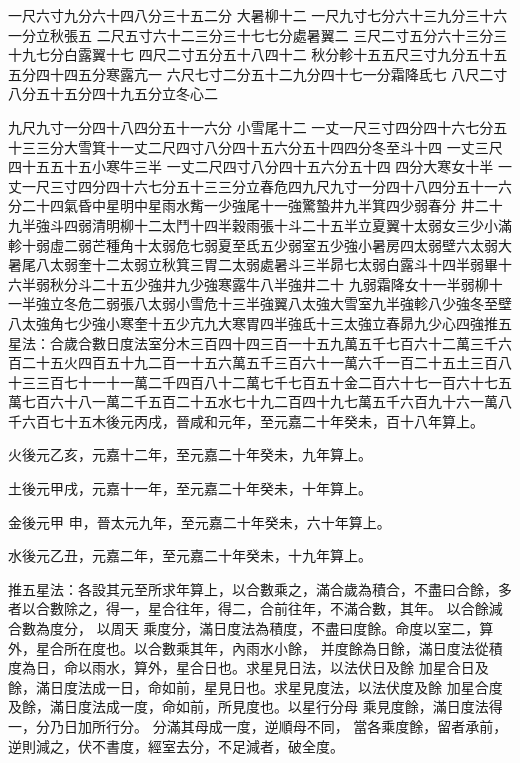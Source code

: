 \begin{pinyinscope}
一尺六寸九分六十四八分三十五二分
 大暑柳十二
 一尺九寸七分六十三九分三十六一分立秋張五
 二尺五寸六十二三分三十七七分處暑翼二
 三尺二寸五分六十三分三十九七分白露翼十七
 四尺二寸五分五十八四十二
 秋分軫十五五尺三寸九分五十五五分四十四五分寒露亢一
 六尺七寸二分五十二九分四十七一分霜降氐七
 八尺二寸八分五十五分四十九五分立冬心二


九尺九寸一分四十八四分五十一六分
 小雪尾十二
 一丈一尺三寸四分四十六七分五十三三分大雪箕十一丈二尺四寸八分四十五六分五十四四分冬至斗十四
 一丈三尺四十五五十五小寒牛三半
 一丈二尺四寸八分四十五六分五十四
 四分大寒女十半
 一丈一尺三寸四分四十六七分五十三三分立春危四九尺九寸一分四十八四分五十一六分二十四氣昏中星明中星雨水觜一少強尾十一強驚蟄井九半箕四少弱春分
 井二十九半強斗四弱清明柳十二太鬥十四半穀雨張十斗二十五半立夏翼十太弱女三少小滿軫十弱虛二弱芒種角十太弱危七弱夏至氐五少弱室五少強小暑房四太弱壁六太弱大暑尾八太弱奎十二太弱立秋箕三胃二太弱處暑斗三半昴七太弱白露斗十四半弱畢十六半弱秋分斗二十五少強井九少強寒露牛八半強井二十
 九弱霜降女十一半弱柳十一半強立冬危二弱張八太弱小雪危十三半強翼八太強大雪室九半強軫八少強冬至壁八太強角七少強小寒奎十五少亢九大寒胃四半強氐十三太強立春昴九少心四強推五星法：合歲合數日度法室分木三百四十四三百一十五九萬五千七百六十二萬三千六百二十五火四百五十九二百一十五六萬五千三百六十一萬六千一百二十五土三百八十三三百七十一十一萬二千四百八十二萬七千七百五十金二百六十七一百六十七五萬七百六十八一萬二千五百二十五水七十九二百四十九七萬五千六百九十六一萬八千六百七十五木後元丙戌，晉咸和元年，至元嘉二十年癸未，百十八年算上。



 火後元乙亥，元嘉十二年，至元嘉二十年癸未，九年算上。



 土後元甲戌，元嘉十一年，至元嘉二十年癸未，十年算上。



 金後元甲
 申，晉太元九年，至元嘉二十年癸未，六十年算上。



 水後元乙丑，元嘉二年，至元嘉二十年癸未，十九年算上。


推五星法：各設其元至所求年算上，以合數乘之，滿合歲為積合，不盡曰合餘，多者以合數除之，得一，星合往年，得二，合前往年，不滿合數，其年。
 以合餘減合數為度分，
 以周天
 乘度分，滿日度法為積度，不盡曰度餘。命度以室二，算外，星合所在度也。以合數乘其年，內雨水小餘，
 并度餘為日餘，滿日度法從積度為日，命以雨水，算外，星合日也。求星見日法，以法伏日及餘
 加星合日及餘，滿日度法成一日，命如前，星見日也。求星見度法，以法伏度及餘
 加星合度及餘，滿日度法成一度，命如前，所見度也。以星行分母
 乘見度餘，滿日度法得一，分乃日加所行分。
 分滿其母成一度，逆順母不同，
 當各乘度餘，留者承前，逆則減之，伏不書度，經室去分，不足減者，破全度。



\end{pinyinscope}
